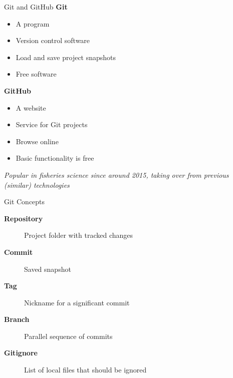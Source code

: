 \documentclass[aspectratio=169]{beamer}
\begin{document}
\begin{frame}{Git and GitHub}\small
  {\bf\darkblue Git}\\[-1ex]
  \begin{itemize}
    \item[] A program \\[0.8ex]
    \item[] Version control software \\[0.8ex]
    \item[] Load and save project snapshots \\[0.8ex]
    \item[] Free software \\[4ex]
  \end{itemize}
  {\bf\darkblue GitHub}\\[-1ex]
  \begin{itemize}
    \item[] A website \\[0.8ex]
    \item[] Service for Git projects \\[0.8ex]
    \item[] Browse online \\[0.8ex]
    \item[] Basic functionality is free \\[4ex]
  \end{itemize}
  \darkgray\it\fns Popular in fisheries science since around 2015, taking over
  from previous (similar) technologies
\end{frame}


\begin{frame}{Git Concepts}\small
  \begin{description}
    \item[\bf\darkblue Repository] Project folder with tracked changes
    \\[5ex]
    \item[\bf\darkblue Commit] Saved snapshot \\[5ex]
    \item[\bf\darkblue Tag] Nickname for a significant commit \\[5ex]
    \item[\bf\darkblue Branch] Parallel sequence of commits \\[5ex]
    \item[\bf\darkblue Gitignore] List of local files that should be ignored
  \end{description}
\end{frame}
\end{document}
